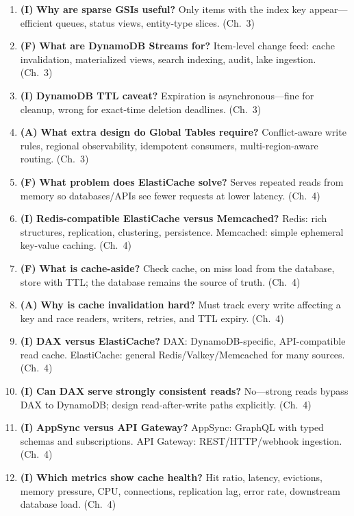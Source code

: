\begin{enumerate}
    \item \textbf{(I)} \textbf{Why are sparse GSIs useful?}
    Only items with the index key appear---efficient queues, status views, entity-type slices.
    (Ch.~3)
    \item \textbf{(F)} \textbf{What are DynamoDB Streams for?}
    Item-level change feed: cache invalidation, materialized views, search indexing, audit, lake
    ingestion. (Ch.~3)
    \item \textbf{(I)} \textbf{DynamoDB TTL caveat?}
    Expiration is asynchronous---fine for cleanup, wrong for exact-time deletion deadlines.
    (Ch.~3)
    \item \textbf{(A)} \textbf{What extra design do Global Tables require?}
    Conflict-aware write rules, regional observability, idempotent consumers, multi-region-aware
    routing. (Ch.~3)
    \item \textbf{(F)} \textbf{What problem does ElastiCache solve?}
    Serves repeated reads from memory so databases/APIs see fewer requests at lower latency.
    (Ch.~4)
    \item \textbf{(I)} \textbf{Redis-compatible ElastiCache versus Memcached?}
    Redis: rich structures, replication, clustering, persistence. Memcached: simple ephemeral
    key-value caching. (Ch.~4)
    \item \textbf{(F)} \textbf{What is cache-aside?}
    Check cache, on miss load from the database, store with TTL; the database remains the source
    of truth. (Ch.~4)
    \item \textbf{(A)} \textbf{Why is cache invalidation hard?}
    Must track every write affecting a key and race readers, writers, retries, and TTL expiry.
    (Ch.~4)
    \item \textbf{(I)} \textbf{DAX versus ElastiCache?}
    DAX: DynamoDB-specific, API-compatible read cache. ElastiCache: general Redis/Valkey/Memcached
    for many sources. (Ch.~4)
    \item \textbf{(I)} \textbf{Can DAX serve strongly consistent reads?}
    No---strong reads bypass DAX to DynamoDB; design read-after-write paths explicitly. (Ch.~4)
    \item \textbf{(I)} \textbf{AppSync versus API Gateway?}
    AppSync: GraphQL with typed schemas and subscriptions. API Gateway: REST/HTTP/webhook
    ingestion. (Ch.~4)
    \item \textbf{(I)} \textbf{Which metrics show cache health?}
    Hit ratio, latency, evictions, memory pressure, CPU, connections, replication lag, error rate,
    downstream database load. (Ch.~4)
\end{enumerate}

